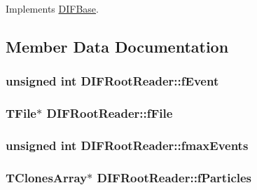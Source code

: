 Implements \hyperlink{classDIFBase_a69e359ba0221a1b7bb32cdcbb819d56a}{DIFBase}.



\subsection{Member Data Documentation}
\hypertarget{classDIFRootReader_aa4beae1437759d5d4fb7d3f357118fe8}{
\subsubsection[{fEvent}]{\setlength{\rightskip}{0pt plus 5cm}unsigned int {\bf DIFRootReader::fEvent}}}
\label{dc/ddc/classDIFRootReader_aa4beae1437759d5d4fb7d3f357118fe8}
\hypertarget{classDIFRootReader_aad2ead3ab401eca6ec51939dfcfb923f}{
\subsubsection[{fFile}]{\setlength{\rightskip}{0pt plus 5cm}TFile$\ast$ {\bf DIFRootReader::fFile}}}
\label{dc/ddc/classDIFRootReader_aad2ead3ab401eca6ec51939dfcfb923f}
\hypertarget{classDIFRootReader_a935660214d9cd8b2035471b7bccb2b1e}{
\subsubsection[{fmaxEvents}]{\setlength{\rightskip}{0pt plus 5cm}unsigned int {\bf DIFRootReader::fmaxEvents}}}
\label{dc/ddc/classDIFRootReader_a935660214d9cd8b2035471b7bccb2b1e}
\hypertarget{classDIFRootReader_a250796ef6bbe231cf75da5e985961ac1}{
\subsubsection[{fParticles}]{\setlength{\rightskip}{0pt plus 5cm}TClonesArray$\ast$ {\bf DIFRootReader::fParticles}}}
